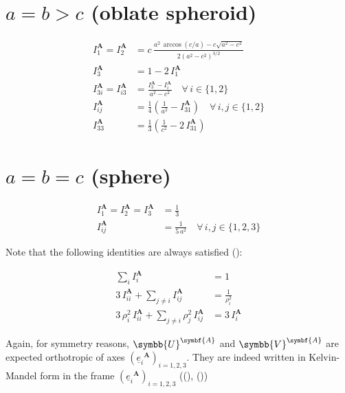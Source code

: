 \documentclass[
  a4paper,
  numbers=noendperiod,
  DIV=12]{scrreprt}
\newcommand{\uu}[1]{{\symbf{{#1}}}}
\newcommand{\uuuu}[1]{{\symbb{{#1}}}}
\newcommand{\uv}[1]{{\underline{{#1}}}}
\newcommand{\ve}[1]{{\uv{{e}}_{{#1}}}}
\begin{document}
\begin{tcolorbox}
\section{\texorpdfstring{\(a = b > c\) (oblate
spheroid)}{a = b \textgreater{} c (oblate spheroid)}}

\begin{align}
I^{\uu{A}}_1=I^{\uu{A}}_2&=c\,
\frac{a^2\,\arccos{(c/a)}-c\sqrt{a^2-c^2}}
{2\left(a^2-c^2\right)^{3/2}}\\
I^{\uu{A}}_3&=1-2\,I^{\uu{A}}_1\\
I^{\uu{A}}_{3i}=I^{\uu{A}}_{i3}&=\frac{I^{\uu{A}}_3-I^{\uu{A}}_i}{a^2-c^2}\quad
\forall\, i\in\{1,2\}\\
I^{\uu{A}}_{ij}&=\frac{1}{4}
\left(\frac{1}{a^2}-I^{\uu{A}}_{31} \right) 
\quad\forall\, i,j\in\{1,2\}\\
I^{\uu{A}}_{33}&=\frac{1}{3}
\left(\frac{1}{c^2}-2\,I^{\uu{A}}_{31} \right)
\end{align}

\section{\texorpdfstring{\(a = b = c\) (sphere)}{a = b = c (sphere)}}

\begin{align}
I^{\uu{A}}_1=I^{\uu{A}}_2=I^{\uu{A}}_3&=\frac{1}{3}\\
I^{\uu{A}}_{ij}&=\frac{1}{5\,a^2}\quad\forall\, i,j\in\{1,2,3\}
\end{align}

Note that the following identities are always satisfied
():

\begin{align}
\sum_{i}I^{\uu{A}}_{i} &=1\\
3\,I^{\uu{A}}_{ii}+\sum_{j\neq i}I^{\uu{A}}_{ij} &=\frac{1}{\rho_i^2}\\
3\,\rho_i^2\,I^{\uu{A}}_{ii}+\sum_{j\neq i}\rho_j^2\,I^{\uu{A}}_{ij} &=3\,I^{\uu{A}}_{i}
\end{align}

\end{tcolorbox}

Again, for symmetry reasons, \(\uuuu{U}^{\uu{A}}\) and
\(\uuuu{V}^{\uu{A}}\) are expected orthotropic of axes
\(\left(\ve{i}^{\uu{A}}\right)_{i=1,2,3}\). They are indeed written in
Kelvin-Mandel form in the frame
\(\left(\ve{i}^{\uu{A}}\right)_{i=1,2,3}\)
((),
())
\end{document}
